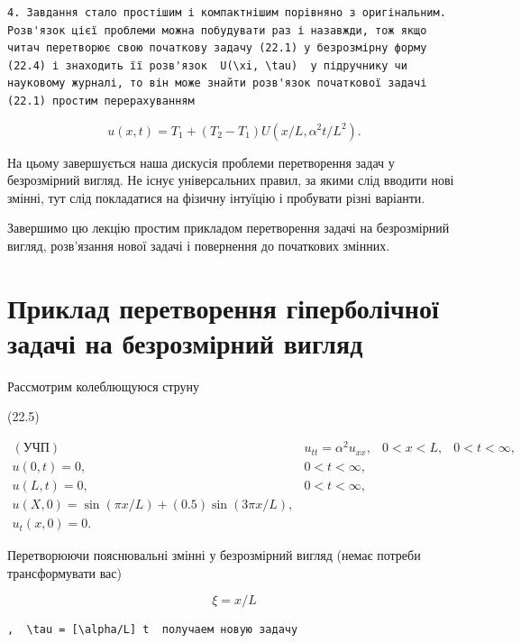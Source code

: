 \documentclass[
  ukrainian,
]{article}
\begin{document}
\begin{verbatim}
4. Завдання стало простішим і компактнішим порівняно з оригінальним. Розв'язок цієї проблеми можна побудувати раз і назавжди, тож якщо читач перетворює свою початкову задачу (22.1) у безрозмірну форму (22.4) і знаходить її розв'язок  U(\xi, \tau)  у підручнику чи науковому журналі, то він може знайти розв'язок початкової задачі (22.1) простим перерахуванням
\end{verbatim}

\[
u(x, t) = T_1 + (T_2 - T_1) U(x/L, \alpha^2 t/L^2).
\]

На цьому завершується наша дискусія проблеми перетворення задач у
безрозмірний вигляд. Не існує універсальних правил, за якими слід
вводити нові змінні, тут слід покладатися на фізичну інтуїцію і
пробувати різні варіанти.

Завершимо цю лекцію простим прикладом перетворення задачі на
безрозмірний вигляд, розв'язання нової задачі і повернення до початкових
змінних.

\section{Приклад перетворення гіперболічної задачі на безрозмірний
вигляд}\label{ux43fux440ux438ux43aux43bux430ux434-ux43fux435ux440ux435ux442ux432ux43eux440ux435ux43dux43dux44f-ux433ux456ux43fux435ux440ux431ux43eux43bux456ux447ux43dux43eux457-ux437ux430ux434ux430ux447ux456-ux43dux430-ux431ux435ux437ux440ux43eux437ux43cux456ux440ux43dux438ux439-ux432ux438ux433ux43bux44fux434}

Рассмотрим колеблющуюся струну

(22.5)

\[
\begin{array}{ll} (\text{УЧП}) & u_{tt} = \alpha^2 u_{xx}, & 0 < x < L, & 0 < t < \infty, \\ u(0, t) = 0, & 0 < t < \infty, \\ u(L, t) = 0, & 0 < t < \infty, \\ u(X, 0) = \sin(\pi x/L) + (0.5)\sin(3\pi x/L), \\ u_t(x, 0) = 0. & \end{array}
\]

Перетворюючи пояснювальні змінні у безрозмірний вигляд (немає потреби
трансформувати вас)

\[
\xi = x/L
\]

\begin{verbatim}
,  \tau = [\alpha/L] t  получаем новую задачу
\end{verbatim}
\end{document}
